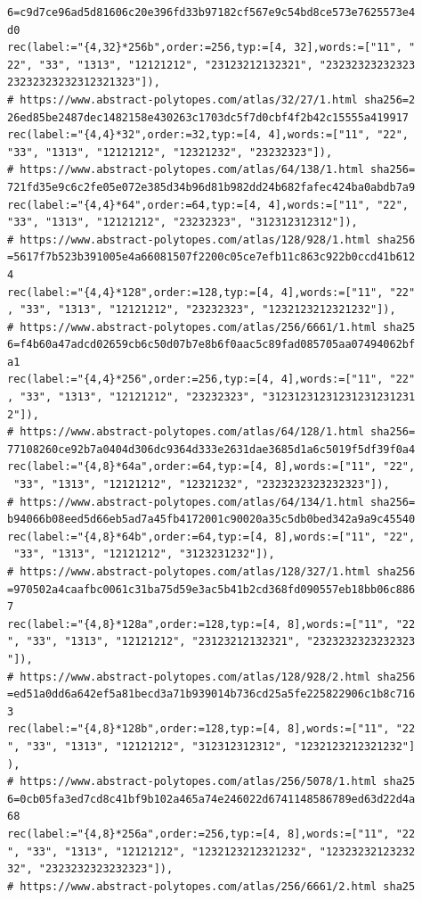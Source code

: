 \documentclass[
  11pt,
  a4paper,
]{article}
\begin{document}
\begin{verbatim}
6=c9d7ce96ad5d81606c20e396fd33b97182cf567e9c54bd8ce573e7625573e4
d0
rec(label:="{4,32}*256b",order:=256,typ:=[4, 32],words:=["11", "
22", "33", "1313", "12121212", "23123212132321", "23232323232323
23232323232312321323"]),
# https://www.abstract-polytopes.com/atlas/32/27/1.html sha256=2
26ed85be2487dec1482158e430263c1703dc5f7d0cbf4f2b42c15555a419917
rec(label:="{4,4}*32",order:=32,typ:=[4, 4],words:=["11", "22", 
"33", "1313", "12121212", "12321232", "23232323"]),
# https://www.abstract-polytopes.com/atlas/64/138/1.html sha256=
721fd35e9c6c2fe05e072e385d34b96d81b982dd24b682fafec424ba0abdb7a9
rec(label:="{4,4}*64",order:=64,typ:=[4, 4],words:=["11", "22", 
"33", "1313", "12121212", "23232323", "312312312312"]),
# https://www.abstract-polytopes.com/atlas/128/928/1.html sha256
=5617f7b523b391005e4a66081507f2200c05ce7efb11c863c922b0ccd41b612
4
rec(label:="{4,4}*128",order:=128,typ:=[4, 4],words:=["11", "22"
, "33", "1313", "12121212", "23232323", "1232123212321232"]),
# https://www.abstract-polytopes.com/atlas/256/6661/1.html sha25
6=f4b60a47adcd02659cb6c50d07b7e8b6f0aac5c89fad085705aa07494062bf
a1
rec(label:="{4,4}*256",order:=256,typ:=[4, 4],words:=["11", "22"
, "33", "1313", "12121212", "23232323", "31231231231231231231231
2"]),
# https://www.abstract-polytopes.com/atlas/64/128/1.html sha256=
77108260ce92b7a0404d306dc9364d333e2631dae3685d1a6c5019f5df39f0a4
rec(label:="{4,8}*64a",order:=64,typ:=[4, 8],words:=["11", "22",
 "33", "1313", "12121212", "12321232", "2323232323232323"]),
# https://www.abstract-polytopes.com/atlas/64/134/1.html sha256=
b94066b08eed5d66eb5ad7a45fb4172001c90020a35c5db0bed342a9a9c45540
rec(label:="{4,8}*64b",order:=64,typ:=[4, 8],words:=["11", "22",
 "33", "1313", "12121212", "3123231232"]),
# https://www.abstract-polytopes.com/atlas/128/327/1.html sha256
=970502a4caafbc0061c31ba75d59e3ac5b41b2cd368fd090557eb18bb06c886
7
rec(label:="{4,8}*128a",order:=128,typ:=[4, 8],words:=["11", "22
", "33", "1313", "12121212", "23123212132321", "2323232323232323
"]),
# https://www.abstract-polytopes.com/atlas/128/928/2.html sha256
=ed51a0dd6a642ef5a81becd3a71b939014b736cd25a5fe225822906c1b8c716
3
rec(label:="{4,8}*128b",order:=128,typ:=[4, 8],words:=["11", "22
", "33", "1313", "12121212", "312312312312", "1232123212321232"]
),
# https://www.abstract-polytopes.com/atlas/256/5078/1.html sha25
6=0cb05fa3ed7cd8c41bf9b102a465a74e246022d6741148586789ed63d22d4a
68
rec(label:="{4,8}*256a",order:=256,typ:=[4, 8],words:=["11", "22
", "33", "1313", "12121212", "1232123212321232", "12323232123232
32", "2323232323232323"]),
# https://www.abstract-polytopes.com/atlas/256/6661/2.html sha25

\end{verbatim}
\end{document}
